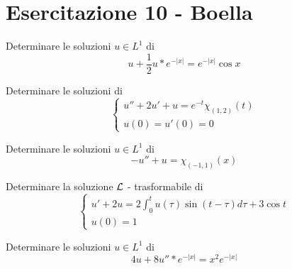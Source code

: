 \chapter{Esercitazione 10 - Boella}
\ParteEsercizi
\Esercizio{}

Determinare le soluzioni $u\in L^{1}$ di
\begin{equation*}
u + \frac{1}{2} u*e^{ - | x| } = e^{ - | x| }\cos x
\end{equation*}
\Esercizio{}

Determinare le soluzioni di
\begin{equation*}
\begin{cases}
u'' + 2u' + u = e^{ - t} \chi _{(1,2)}(t)\\
u(0) = u'(0) = 0
\end{cases}
\end{equation*}
\Esercizio{}

Determinare le soluzioni $u\in L^{1}$ di
\begin{equation*}
- u'' + u = \chi _{(- 1,1)}(x)
\end{equation*}
\Esercizio{}

Determinare la soluzione $\mathcal{L}$ - trasformabile di
\begin{equation*}
\begin{cases}
u' + 2u = 2\int ^{t}_{0} u(\tau)\sin(t - \tau) d\tau + 3\cos t\\
u(0) = 1
\end{cases}
\end{equation*}
\Esercizio{}

Determinare le soluzioni $u\in L^{1}$ di
\begin{equation*}
4u + 8u''*e^{ - | x| } = x^{2} e^{ - | x| }
\end{equation*}
\Esercizio{}

